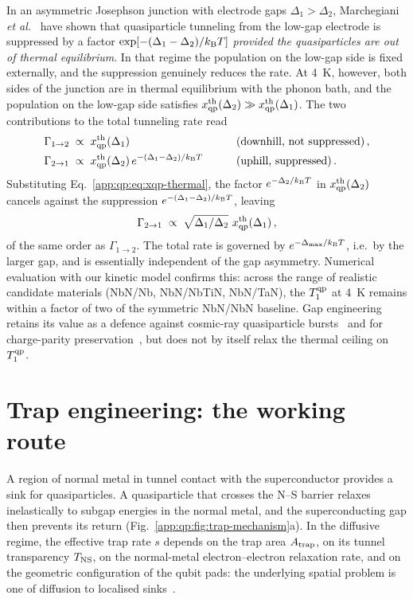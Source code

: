 In an asymmetric Josephson junction with electrode gaps $\Delta_1 > \Delta_2$,
Marchegiani \emph{et al.}~\cite{Marchegiani2022} have shown that quasiparticle
tunneling from the low-gap electrode is suppressed by a factor
$\exp[-(\Delta_1 - \Delta_2)/k_{\rm B} T]$ \emph{provided the quasiparticles are
out of thermal equilibrium}.  In that regime the population on the low-gap
side is fixed externally, and the suppression genuinely reduces the rate.
At \SI{4}{\kelvin}, however, both sides of the junction are in thermal
equilibrium with the phonon bath, and the population on the low-gap side
satisfies $x_{\rm qp}^{\rm th}(\Delta_2) \gg x_{\rm qp}^{\rm th}(\Delta_1)$.  The two
contributions to the total tunneling rate read
\begin{align}
  \Gamma_{1\to 2}
   &\;\propto\; x_{\rm qp}^{\rm th}(\Delta_1)
   \qquad &&\text{(downhill, not suppressed)}\,,
   \label{app:qp:eq:rate-down}\\
  \Gamma_{2\to 1}
   &\;\propto\; x_{\rm qp}^{\rm th}(\Delta_2)\,e^{-(\Delta_1-\Delta_2)/k_{\rm B} T}
   \qquad &&\text{(uphill, suppressed)}\,.
   \label{app:qp:eq:rate-up}
\end{align}
Substituting Eq.~\eqref{app:qp:eq:xqp-thermal}, the factor
$e^{-\Delta_2/k_{\rm B} T}$ in $x_{\rm qp}^{\rm th}(\Delta_2)$ cancels against the
suppression $e^{-(\Delta_1-\Delta_2)/k_{\rm B} T}$, leaving
\begin{equation}
  \Gamma_{2\to 1}
   \;\propto\; \sqrt{\Delta_1/\Delta_2}\,\,x_{\rm qp}^{\rm th}(\Delta_1)\,,
\end{equation}
of the same order as $\Gamma_{1\to 2}$.  The total rate is governed by
$e^{-\Delta_{\max}/k_{\rm B} T}$, i.e.\ by the larger gap, and is essentially
independent of the gap asymmetry.  Numerical evaluation with our kinetic
model confirms this: across the range of realistic candidate materials
(NbN/Nb, NbN/NbTiN, NbN/TaN), the $T_1^{\rm qp}$ at \SI{4}{\kelvin}
remains within a factor of two of the symmetric NbN/NbN baseline.
Gap engineering retains its value as a defence against cosmic-ray
quasiparticle bursts~\cite{McEwen2022} and for charge-parity
preservation~\cite{Kamenov2024}, but does not by itself relax the thermal
ceiling on $T_1^{\rm qp}$.


\section{Trap engineering: the working route}
\label{app:qp:traps}

A region of normal metal in tunnel contact with the superconductor provides
a sink for quasiparticles.  A quasiparticle that crosses the N--S barrier
relaxes inelastically to subgap energies in the normal metal, and the
superconducting gap then prevents its return
(Fig.~\ref{app:qp:fig:trap-mechanism}a).  In the diffusive regime, the
effective trap rate $s$ depends on the trap area $A_{\rm trap}$, on its
tunnel transparency $T_{\rm NS}$, on the normal-metal electron--electron
relaxation rate, and on the geometric configuration of the qubit pads:
the underlying spatial problem is one of diffusion to localised
sinks~\cite{Riwar2016,Hosseinkhani2017}.

